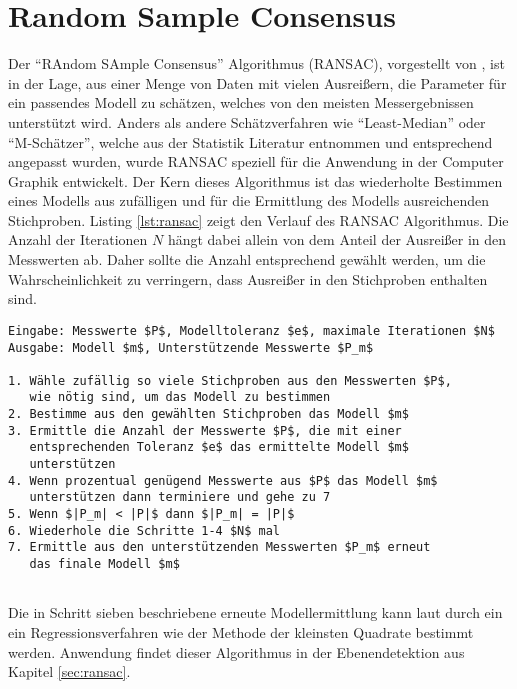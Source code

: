 \section{Random Sample Consensus} \label{sec:ransac-theory}

Der \enquote{RAndom SAmple Consensus} Algorithmus (RANSAC), vorgestellt von \citet{fischler1981random}, ist in der Lage, aus einer Menge von Daten mit vielen Ausreißern, die Parameter für ein passendes Modell zu schätzen, welches von den meisten Messergebnissen unterstützt wird. Anders als andere Schätzverfahren wie \enquote{Least-Median} oder \enquote{M-Schätzer}, welche aus der Statistik Literatur entnommen und entsprechend angepasst wurden, wurde RANSAC speziell für die Anwendung in der Computer Graphik entwickelt. Der Kern dieses Algorithmus ist das wiederholte Bestimmen eines Modells aus zufälligen und für die Ermittlung des Modells ausreichenden Stichproben. Listing \ref{lst:ransac} zeigt den Verlauf des RANSAC Algorithmus. Die Anzahl der Iterationen \(N\) hängt dabei allein von dem Anteil der Ausreißer in den Messwerten ab. Daher sollte die Anzahl entsprechend gewählt werden, um die Wahrscheinlichkeit zu verringern, dass Ausreißer in den Stichproben enthalten sind. \citep{derpanis2010overview} \\

\begin{lstlisting}[mathescape,caption=Der RANSAC Algorithmus, label=lst:ransac, float=htbp]
Eingabe: Messwerte $P$, Modelltoleranz $e$, maximale Iterationen $N$
Ausgabe: Modell $m$, Unterstützende Messwerte $P_m$

1. Wähle zufällig so viele Stichproben aus den Messwerten $P$,
   wie nötig sind, um das Modell zu bestimmen
2. Bestimme aus den gewählten Stichproben das Modell $m$
3. Ermittle die Anzahl der Messwerte $P$, die mit einer 
   entsprechenden Toleranz $e$ das ermittelte Modell $m$ 
   unterstützen
4. Wenn prozentual genügend Messwerte aus $P$ das Modell $m$ 
   unterstützen dann terminiere und gehe zu 7
5. Wenn $|P_m| < |P|$ dann $|P_m| = |P|$
6. Wiederhole die Schritte 1-4 $N$ mal
7. Ermittle aus den unterstützenden Messwerten $P_m$ erneut 
   das finale Modell $m$
   
\end{lstlisting} 

Die in Schritt sieben beschriebene erneute Modellermittlung kann laut \citet{fischler1981random} durch ein ein Regressionsverfahren wie der Methode der kleinsten Quadrate bestimmt werden. Anwendung findet dieser Algorithmus in der Ebenendetektion aus Kapitel \ref{sec:ransac}.